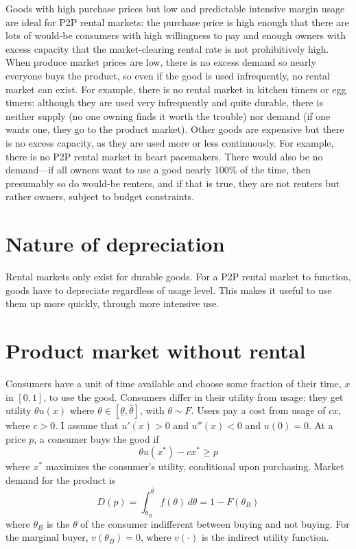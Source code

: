 \documentclass[11pt]{article}
\begin{document}
Goods with high purchase prices but low and predictable intensive margin usage are ideal for P2P rental markets: 
the purchase price is high enough that there are lots of would-be consumers with high willingness to pay and enough owners with excess capacity that the market-clearing rental rate is not prohibitively high. 
When produce market prices are low, there is no excess demand so nearly everyone buys the product, so even if the good is used infrequently, no rental market can exist.  
For example, there is no rental market in kitchen timers or egg timers: although they are used very infrequently and quite durable, there is neither supply (no one owning finds it worth the trouble) nor demand (if one wants one, they go to the product market). 
Other goods are expensive but there is no excess capacity, as they are used more or less continuously. 
For example, there is no P2P rental market in heart pacemakers. 
There would also be no demand---if all owners want to use a good nearly 100\% of the time, then presumably so do would-be renters, and if that is true, they are not renters but rather owners, subject to budget constraints.   

\section{Nature of depreciation} 
Rental markets only exist for durable goods. 
For a P2P rental market to function, goods have to depreciate regardless of usage level. 
This makes it useful to use them up more quickly, through more intensive use. 

\section{Product market without rental} 
Consumers have a unit of time available and choose some fraction of their time, $x$ in $[0,1]$, to use the good. 
Consumers differ in their utility from usage: they get utility $\theta u(x)$ where $\theta \in [\underline{\theta}, \bar{\theta}]$, with $\theta \sim F$.  
Users pay a cost from usage of $cx$, where $c > 0$. 
I assume that $u'(x) > 0$ and $u''(x) < 0$ and $u(0) = 0$.
At a price $p$, a consumer buys the good if 
\begin{equation}
\theta u(x^*) - cx^* \ge p  
\end{equation} 
where $x^*$ maximizes the consumer's utility, conditional upon purchasing. 
Market demand for the product is 
\begin{equation}
D(p) = \int_{\theta_B}^{\bar{\theta}} f(\theta) \, d\theta  = 1 - F(\theta_B)
\end{equation} 
where $\theta_B$ is the $\theta$ of the consumer indifferent between buying and not buying. 
For the marginal buyer, $v(\theta_B) = 0$, where $v(\cdot)$ is the indirect utility function.  
\end{document}
